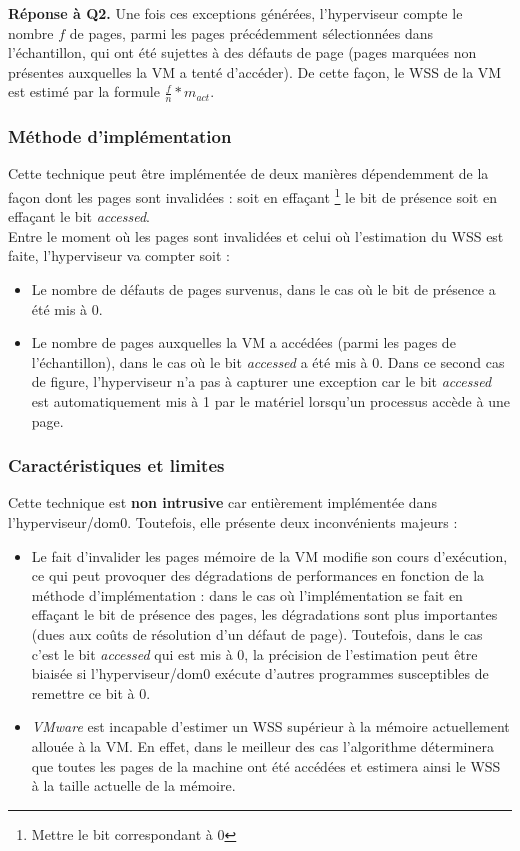 \par{\textbf{Réponse à Q2.}} Une fois ces exceptions générées, l'hyperviseur compte le nombre $f$ de pages, parmi les pages précédemment sélectionnées dans l'échantillon, qui ont été sujettes à des défauts de page (pages marquées non présentes auxquelles la VM a tenté d'accéder). De cette façon, le WSS de la VM est estimé par la formule $ \frac{f}{n}* \textit{m}_\textit{act} $.

\subsubsection{Méthode d'implémentation}
Cette technique peut être implémentée de deux manières dépendemment de la façon dont les pages sont invalidées : soit en effaçant \footnote{Mettre le bit correspondant à 0} le bit de présence soit en effaçant le bit \textit{accessed}.\\
Entre le moment où les pages sont invalidées et celui où l'estimation du WSS est faite, l'hyperviseur va compter soit :
\begin{itemize}
    \item Le nombre de défauts de pages survenus, dans le cas où le bit de présence a été mis à 0.
    \item Le nombre de pages auxquelles la VM a accédées (parmi les pages de l'échantillon), dans le cas où le bit \textit{accessed} a été mis à 0. Dans ce second cas de figure, l'hyperviseur n'a pas à capturer une exception car le bit \textit{accessed} est automatiquement mis à 1 par le matériel lorsqu'un processus accède à une page.
\end{itemize}

\subsubsection{Caractéristiques et limites} 
Cette technique est \textbf{non intrusive} car entièrement implémentée dans l'hyperviseur/dom0. Toutefois, elle présente deux inconvénients majeurs : 
\begin{itemize}
    \item Le fait d'invalider les pages mémoire de la VM modifie son cours d'exécution, ce qui peut provoquer des dégradations de performances en fonction de la méthode d'implémentation : dans le cas où l'implémentation se fait en effaçant le bit de présence des pages, les dégradations sont plus importantes (dues aux coûts de résolution d'un défaut de page). Toutefois, dans le cas c'est le bit \textit{accessed} qui est mis à 0, la précision de l'estimation peut être biaisée si l'hyperviseur/dom0 exécute d'autres programmes susceptibles de remettre ce bit à 0.
    \item \textit{VMware} est incapable d'estimer un WSS supérieur à la mémoire actuellement allouée à la VM. En effet, dans le meilleur des cas l'algorithme déterminera que toutes les pages de la machine ont été accédées et estimera ainsi le WSS à la taille actuelle de la mémoire.
\end{itemize}

